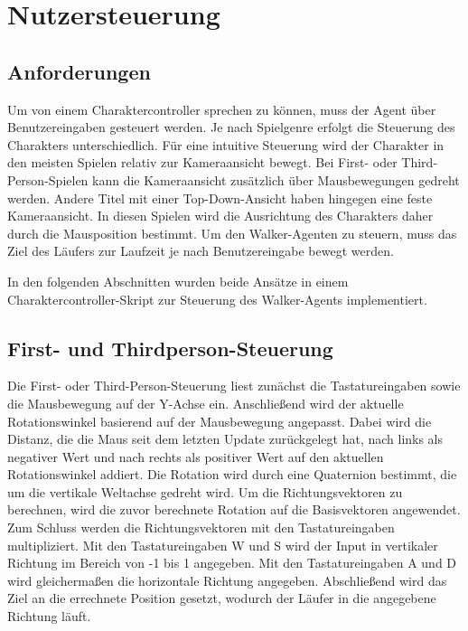 \section{Nutzersteuerung}
\subsection{Anforderungen}
Um von einem Charaktercontroller sprechen zu können, muss der Agent über Benutzereingaben gesteuert werden. Je nach Spielgenre erfolgt die Steuerung des Charakters unterschiedlich. Für eine intuitive Steuerung wird der Charakter in den meisten Spielen relativ zur Kameraansicht bewegt. Bei First- oder Third-Person-Spielen kann die Kameraansicht zusätzlich über Mausbewegungen gedreht werden. Andere Titel mit einer Top-Down-Ansicht haben hingegen eine feste Kameraansicht. In diesen Spielen wird die Ausrichtung des Charakters daher durch die Mausposition bestimmt. Um den Walker-Agenten zu steuern, muss das Ziel des Läufers zur Laufzeit je nach Benutzereingabe bewegt werden.

In den folgenden Abschnitten wurden beide Ansätze in einem Charaktercontroller-Skript zur Steuerung des Walker-Agents implementiert.

\subsection{First- und Thirdperson-Steuerung}
Die First- oder Third-Person-Steuerung liest zunächst die Tastatureingaben sowie die Mausbewegung auf der Y-Achse ein. Anschließend wird der aktuelle Rotationswinkel basierend auf der Mausbewegung angepasst. Dabei wird die Distanz, die die Maus seit dem letzten Update zurückgelegt hat, nach links als negativer Wert und nach rechts als positiver Wert auf den aktuellen Rotationswinkel addiert. Die Rotation wird durch eine Quaternion bestimmt, die um die vertikale Weltachse gedreht wird. Um die Richtungsvektoren zu berechnen, wird die zuvor berechnete Rotation auf die Basisvektoren angewendet. Zum Schluss werden die Richtungsvektoren mit den Tastatureingaben multipliziert. Mit den Tastatureingaben W und S wird der Input in vertikaler Richtung im Bereich von -1 bis 1 angegeben. Mit den Tastatureingaben A und D wird gleichermaßen die horizontale Richtung angegeben. Abschließend wird das Ziel an die errechnete Position gesetzt, wodurch der Läufer in die angegebene Richtung läuft.

